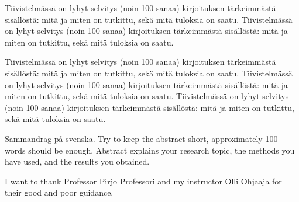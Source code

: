 \documentclass[english,12pt,a4paper,pdftex,elec,utf8]{aaltothesis}
\begin{document}
\newpage
%
\begin{abstractpage}[finnish]
  Tiivistelmässä on lyhyt selvitys (noin 100 sanaa)
  kirjoituksen tärkeimmästä sisällöstä: mitä ja miten on tutkittu,
  sekä mitä tuloksia on saatu.
  Tiivistelmässä on lyhyt selvitys (noin 100 sanaa)
  kirjoituksen tärkeimmästä sisällöstä: mitä ja miten on tutkittu,
  sekä mitä tuloksia on saatu.

  Tiivistelmässä on lyhyt selvitys (noin 100 sanaa)
  kirjoituksen tärkeimmästä sisällöstä: mitä ja miten on tutkittu,
  sekä mitä tuloksia on saatu.
  Tiivistelmässä on lyhyt selvitys (noin 100 sanaa)
  kirjoituksen tärkeimmästä sisällöstä: mitä ja miten on tutkittu,
  sekä mitä tuloksia on saatu.
  Tiivistelmässä on lyhyt selvitys (noin 100 sanaa)
  kirjoituksen tärkeimmästä sisällöstä: mitä ja miten on tutkittu,
  sekä mitä tuloksia on saatu.
\end{abstractpage}

\newpage
%
%
\begin{abstractpage}[swedish]
 Sammandrag p\aa{} svenska.
 Try to keep the abstract short, approximately
 100 words should be enough. Abstract explains your research topic,
 the methods you have used, and the results you obtained.
\end{abstractpage}

I want to thank Professor Pirjo Professori
and my instructor Olli Ohjaaja for their
good and poor guidance.\\
\end{document}
